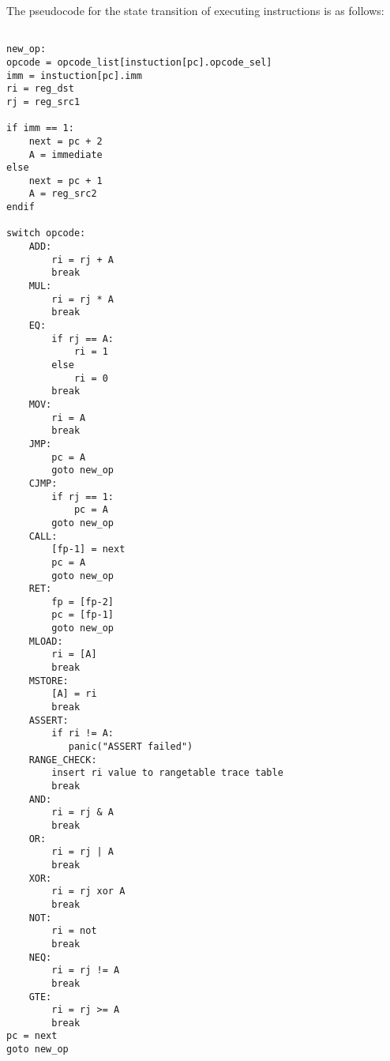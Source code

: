 \begin{table}[!ht]
    \centering {}
    \caption{OlaVM instruction encode format}
    \label{table: processor_instruction_decode}
\end{table}

The pseudocode for the state transition of executing instructions is as follows:
\begin{lstlisting}[language={}]

new_op:
opcode = opcode_list[instuction[pc].opcode_sel]
imm = instuction[pc].imm
ri = reg_dst
rj = reg_src1

if imm == 1:
    next = pc + 2
    A = immediate
else
    next = pc + 1
    A = reg_src2
endif

switch opcode:
    ADD:
        ri = rj + A
        break
    MUL:
        ri = rj * A
        break
    EQ:
        if rj == A:
            ri = 1
        else
            ri = 0
        break
    MOV:
        ri = A
        break
    JMP:
        pc = A
        goto new_op
    CJMP:
        if rj == 1:
            pc = A
        goto new_op
    CALL:
        [fp-1] = next
        pc = A
        goto new_op
    RET:
        fp = [fp-2]
        pc = [fp-1]
        goto new_op
    MLOAD:
        ri = [A]
        break
    MSTORE:
        [A] = ri
        break
    ASSERT:
        if ri != A:
           panic("ASSERT failed")
    RANGE_CHECK:
        insert ri value to rangetable trace table
        break
    AND:
        ri = rj & A
        break
    OR:
        ri = rj | A
        break
    XOR:
        ri = rj xor A
        break
    NOT:
        ri = not
        break
    NEQ:
        ri = rj != A
        break
    GTE:
        ri = rj >= A
        break
pc = next
goto new_op
\end{lstlisting}



